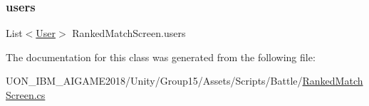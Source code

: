 \subsubsection{\texorpdfstring{users}{users}}
{\footnotesize\ttfamily List$<$\mbox{\hyperlink{class_user}{User}}$>$ Ranked\+Match\+Screen.\+users\hspace{0.3cm}{\ttfamily [private]}}



The documentation for this class was generated from the following file\+:\begin{DoxyCompactItemize}
\item 
U\+O\+N\+\_\+\+I\+B\+M\+\_\+\+A\+I\+G\+A\+M\+E2018/\+Unity/\+Group15/\+Assets/\+Scripts/\+Battle/\mbox{\hyperlink{_ranked_match_screen_8cs}{Ranked\+Match\+Screen.\+cs}}\end{DoxyCompactItemize}
